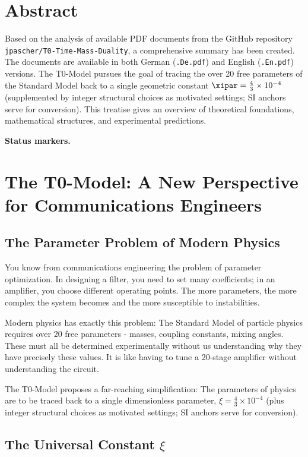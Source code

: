 \section*{Abstract}
Based on the analysis of available PDF documents from the GitHub repository \texttt{jpascher/T0-Time-Mass-Duality}, a comprehensive summary has been created. The documents are available in both German (\texttt{.De.pdf}) and English (\texttt{.En.pdf}) versions. The T0-Model pursues the goal of tracing the over 20 free parameters of the Standard Model back to a single geometric constant $\xipar = \frac{4}{3} \times 10^{-4}$ (supplemented by integer structural choices as motivated settings; SI anchors serve for conversion). This treatise gives an overview of theoretical foundations, mathematical structures, and experimental predictions.

\medskip\noindent\textbf{Status markers.}



\section{The T0-Model: A New Perspective for Communications Engineers}

\subsection{The Parameter Problem of Modern Physics}

You know from communications engineering the problem of parameter optimization. In designing a filter, you need to set many coefficients; in an amplifier, you choose different operating points. The more parameters, the more complex the system becomes and the more susceptible to instabilities.

Modern physics has exactly this problem: The Standard Model of particle physics requires over 20 free parameters - masses, coupling constants, mixing angles. These must all be determined experimentally without us understanding why they have precisely these values. It is like having to tune a 20-stage amplifier without understanding the circuit.

The T0-Model proposes a far-reaching simplification: The parameters of physics are to be traced back to a single dimensionless parameter, $\xi = \frac{4}{3} \times 10^{-4}$ (plus integer structural choices as motivated settings; SI anchors serve for conversion).

\subsection{The Universal Constant $\xi$}

